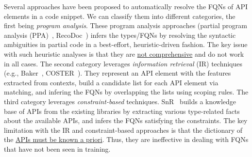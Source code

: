 Several approaches have been proposed to automatically resolve the FQNs of API elements in a code snippet. We can classify them into different categories, the first being {\em program analysis}. These program analysis approaches (partial program analysis (PPA)~\cite{dagenais-oopsla08}, RecoDoc~\cite{dagenais-icse12}) infers the types/FQNs by resolving the syntactic ambiguities in partial code in a best-effort, heuristic-driven fashion. The key issue with such heuristic analyses is that they are \underline{not comprehensive} and do not work in all cases. The second category leverages {\em information retrieval} (IR) techniques (e.g., Baker~\cite{liveapi14}, COSTER~\cite{coster-ase19}). They represent an API element with the features extracted from contexts, build a candidate list for each API element via matching, and infering the FQNs by overlapping the lists using scoping rules. The third category leverages {\em constraint-based} techniques. SnR~\cite{snr-icse22} builds a knowledge base of APIs from the existing libraries by extracting various type-related facts about the available APIs, and infers the FQNs satisfying the constraints. The key limitation with the IR and constraint-based approaches is that the dictionary of the \underline{APIs must be known a priori}. Thus, they are ineffective in dealing with FQNs that have not been seen in training.

